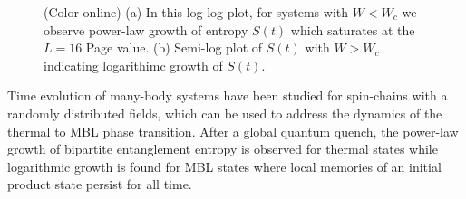\documentclass[prl,aps,epsf,showpacs,twocolumn,letterpaper]{revtex4}
\begin{document}
\begin{figure}[b]
	\caption{
		(Color online) (a) In this log-log plot, for systems with $W<W_c$ we observe power-law growth of entropy $S(t)$ which saturates at the $L=16$ Page value. (b) Semi-log plot of $S(t)$ with $W > W_c$ indicating logarithimc growth of $S(t)$.}
	\label{fig2}
\end{figure}


Time evolution of many-body systems have been studied for spin-chains with a randomly distributed fields\cite{kjall2014,luitz2016time}, which can be used to address the dynamics of the thermal to MBL phase transition\cite{nandkishore2015,vosk_theory2014,potter2015}.  After a global quantum quench, the power-law growth of bipartite entanglement entropy is observed for thermal states while logarithmic growth is found  for MBL states where  local memories of an initial product state persist for all time\cite{luitz2016time}.
\end{document}
